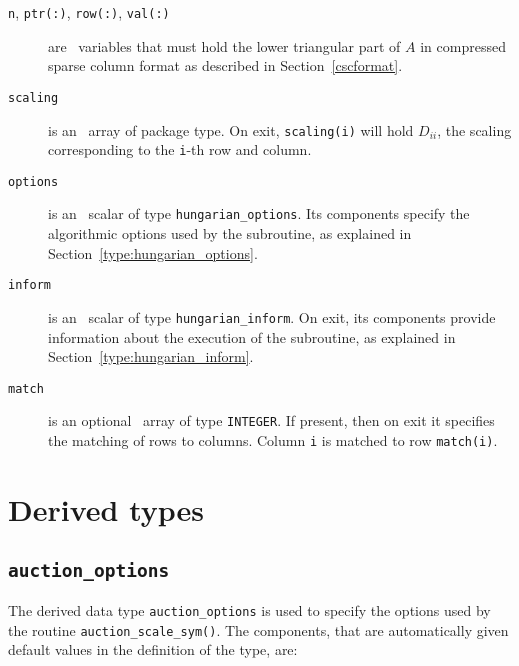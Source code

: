\begin{description}

\item[\texttt{n}, \texttt{ptr(:)}, \texttt{row(:)}, \texttt{val(:)}] are \intentin\ variables that must hold the lower triangular part of $A$ in compressed sparse column format as described in Section~\ref{cscformat}.

\item[\texttt{scaling}] is an \intentout\ array of package type. On exit,
\texttt{scaling(i)} will hold $D_{ii}$, the scaling corresponding to the
\texttt{i}-th row and column.

\item[\texttt{options}] is an \intentin\ scalar of type \texttt{hungarian\_options}. Its components specify the algorithmic options used by the subroutine, as explained in Section~\ref{type:hungarian_options}.

\item[\texttt{inform}] is an \intentout\ scalar of type \texttt{hungarian\_inform}. On exit, its components provide information about the execution of the subroutine, as explained in Section~\ref{type:hungarian_inform}.

\item[\texttt{match}] is an optional \intentout\ array of type {\tt INTEGER}.
If present, then on exit it specifies the matching of rows to columns.
Column \texttt{i} is matched to row \texttt{match(i)}.

\end{description}


\section{Derived types}
\subsection{\texttt{auction\_options}} \label{type:auction_options}

The derived data type \texttt{auction\_options} is used to specify the options
used by the routine \texttt{auction\_scale\_sym()}. The components, that
are automatically given default values in the definition of the type, are:


